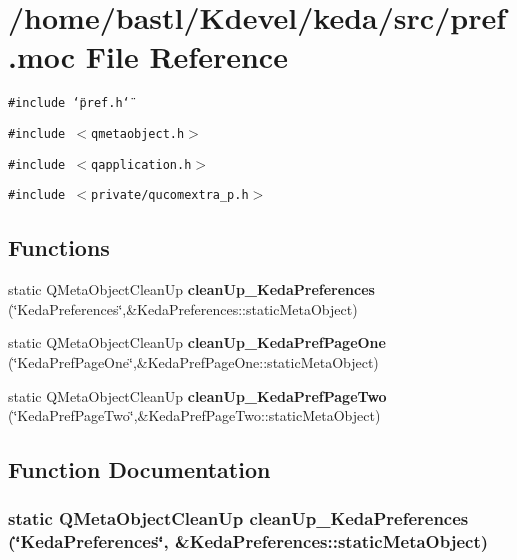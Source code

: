 \section{/home/bastl/Kdevel/keda/src/pref.moc File Reference}
\label{src_2pref_8moc}
{\tt \#include \char`\"{}pref.h\char`\"{}}\par
{\tt \#include $<$qmetaobject.h$>$}\par
{\tt \#include $<$qapplication.h$>$}\par
{\tt \#include $<$private/qucomextra\_\-p.h$>$}\par
\subsection*{Functions}
\begin{CompactItemize}
\item 
static QMeta\-Object\-Clean\-Up {\bf clean\-Up\_\-Keda\-Preferences} (\char`\"{}Keda\-Preferences\char`\"{},\&Keda\-Preferences::static\-Meta\-Object)
\item 
static QMeta\-Object\-Clean\-Up {\bf clean\-Up\_\-Keda\-Pref\-Page\-One} (\char`\"{}Keda\-Pref\-Page\-One\char`\"{},\&Keda\-Pref\-Page\-One::static\-Meta\-Object)
\item 
static QMeta\-Object\-Clean\-Up {\bf clean\-Up\_\-Keda\-Pref\-Page\-Two} (\char`\"{}Keda\-Pref\-Page\-Two\char`\"{},\&Keda\-Pref\-Page\-Two::static\-Meta\-Object)
\end{CompactItemize}


\subsection{Function Documentation}
\subsubsection{\setlength{\rightskip}{0pt plus 5cm}static QMeta\-Object\-Clean\-Up clean\-Up\_\-Keda\-Preferences (\char`\"{}Keda\-Preferences\char`\"{}, \&Keda\-Preferences::static\-Meta\-Object)\hspace{0.3cm}{\tt  [static]}}\label{src_2pref_8moc_cc4934fcc8f64bf37600430d9cc4aa0a}


